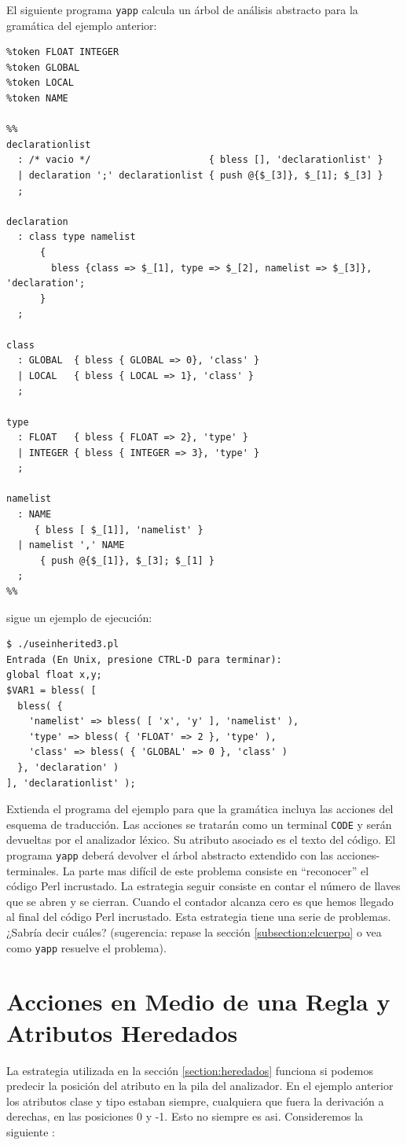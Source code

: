 \begin{exercise}
El siguiente programa \verb|yapp| calcula 
un árbol de análisis abstracto para la gramática
del ejemplo anterior:
\begin{verbatim}
%token FLOAT INTEGER 
%token GLOBAL 
%token LOCAL 
%token NAME

%%
declarationlist 
  : /* vacio */                     { bless [], 'declarationlist' } 
  | declaration ';' declarationlist { push @{$_[3]}, $_[1]; $_[3] }
  ;

declaration
  : class type namelist 
      { 
        bless {class => $_[1], type => $_[2], namelist => $_[3]}, 'declaration'; 
      }
  ;

class
  : GLOBAL  { bless { GLOBAL => 0}, 'class' } 
  | LOCAL   { bless { LOCAL => 1}, 'class' }
  ;

type
  : FLOAT   { bless { FLOAT => 2}, 'type' } 
  | INTEGER { bless { INTEGER => 3}, 'type' }
  ;

namelist
  : NAME  
     { bless [ $_[1]], 'namelist' }
  | namelist ',' NAME 
      { push @{$_[1]}, $_[3]; $_[1] }
  ;
%%
\end{verbatim}
sigue un ejemplo de ejecución:
\begin{verbatim}
$ ./useinherited3.pl
Entrada (En Unix, presione CTRL-D para terminar):
global float x,y;
$VAR1 = bless( [
  bless( {
    'namelist' => bless( [ 'x', 'y' ], 'namelist' ),
    'type' => bless( { 'FLOAT' => 2 }, 'type' ),
    'class' => bless( { 'GLOBAL' => 0 }, 'class' )
  }, 'declaration' )
], 'declarationlist' );
\end{verbatim}

Extienda el programa del ejemplo para que la gramática 
incluya las acciones del esquema de traducción.
Las acciones se tratarán como un terminal \verb|CODE|
y serán devueltas por el analizador léxico. Su atributo
asociado es el texto del código. El programa 
\verb|yapp| deberá devolver el árbol abstracto
extendido con las acciones-terminales.
La parte mas difícil de este problema consiste en ``reconocer''
el código Perl incrustado. La estrategia seguir consiste
en contar el número de llaves que se abren y se cierran.
Cuando el contador alcanza cero es que hemos llegado
al final del código Perl incrustado. Esta estrategia
tiene una serie de problemas. ¿Sabría decir cuáles?
(sugerencia: repase la sección \ref{subsection:elcuerpo} 
o vea como \verb|yapp| resuelve el problema).
\end{exercise}

\section{Acciones en Medio de una Regla y Atributos Heredados}
\label{section:mediaregla}
La estrategia utilizada en la sección \ref{section:heredados} funciona
si podemos predecir la posición del atributo en la pila del analizador.
En el ejemplo anterior los atributos clase y tipo estaban siempre,
cualquiera que fuera la derivación a derechas, 
en las posiciones 0 y -1. Esto no siempre es asi. Consideremos
la siguiente :

